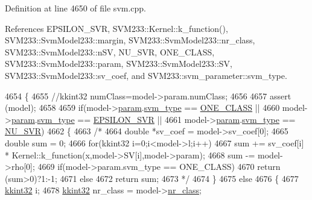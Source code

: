 Definition at line 4650 of file svm.\+cpp.



References E\+P\+S\+I\+L\+O\+N\+\_\+\+S\+VR, S\+V\+M233\+::\+Kernel\+::k\+\_\+function(), S\+V\+M233\+::\+Svm\+Model233\+::margin, S\+V\+M233\+::\+Svm\+Model233\+::nr\+\_\+class, S\+V\+M233\+::\+Svm\+Model233\+::n\+SV, N\+U\+\_\+\+S\+VR, O\+N\+E\+\_\+\+C\+L\+A\+SS, S\+V\+M233\+::\+Svm\+Model233\+::param, S\+V\+M233\+::\+Svm\+Model233\+::\+SV, S\+V\+M233\+::\+Svm\+Model233\+::sv\+\_\+coef, and S\+V\+M233\+::svm\+\_\+parameter\+::svm\+\_\+type.


\begin{DoxyCode}
4654 \{
4655   \textcolor{comment}{//kkint32 numClass=model->param.numClass;}
4656 
4657   assert (model);
4658 
4659   \textcolor{keywordflow}{if}(model->\hyperlink{struct_s_v_m233_1_1_svm_model233_aea9d5d416f02777981c7677da2044571}{param}.\hyperlink{struct_s_v_m233_1_1svm__parameter_aa4cc55eaf546e2edb0ff62c5a5f8466e}{svm\_type} == \hyperlink{namespace_s_v_m233_acde4c278f323c82a6b41c27f6f30738aaea64d54fb16ebcd95d48c4aef97036df}{ONE\_CLASS} ||
4660     model->\hyperlink{struct_s_v_m233_1_1_svm_model233_aea9d5d416f02777981c7677da2044571}{param}.\hyperlink{struct_s_v_m233_1_1svm__parameter_aa4cc55eaf546e2edb0ff62c5a5f8466e}{svm\_type} == \hyperlink{namespace_s_v_m233_acde4c278f323c82a6b41c27f6f30738aae7f29e93ef95067dcc6827e4fe3071c7}{EPSILON\_SVR} ||
4661     model->\hyperlink{struct_s_v_m233_1_1_svm_model233_aea9d5d416f02777981c7677da2044571}{param}.\hyperlink{struct_s_v_m233_1_1svm__parameter_aa4cc55eaf546e2edb0ff62c5a5f8466e}{svm\_type} == \hyperlink{namespace_s_v_m233_acde4c278f323c82a6b41c27f6f30738aaa9c624ae638f160fb1f00081960014b6}{NU\_SVR})
4662   \{
4663     \textcolor{comment}{/*}
4664 \textcolor{comment}{    double *sv\_coef = model->sv\_coef[0];}
4665 \textcolor{comment}{    double sum = 0;}
4666 \textcolor{comment}{    for(kkint32 i=0;i<model->l;i++)}
4667 \textcolor{comment}{    sum += sv\_coef[i] * Kernel::k\_function(x,model->SV[i],model->param);}
4668 \textcolor{comment}{    sum -= model->rho[0];}
4669 \textcolor{comment}{    if(model->param.svm\_type == ONE\_CLASS)}
4670 \textcolor{comment}{    return (sum>0)?1:-1;}
4671 \textcolor{comment}{    else}
4672 \textcolor{comment}{    return sum;}
4673 \textcolor{comment}{    */}
4674   \}
4675   \textcolor{keywordflow}{else}
4676   \{
4677     \hyperlink{namespace_k_k_b_a8fa4952cc84fda1de4bec1fbdd8d5b1b}{kkint32} i;
4678     \hyperlink{namespace_k_k_b_a8fa4952cc84fda1de4bec1fbdd8d5b1b}{kkint32} nr\_class = model->\hyperlink{struct_s_v_m233_1_1_svm_model233_a55a9d2b4d87f50f14dfdcc1afc65b47b}{nr\_class};

\end{DoxyCode}
